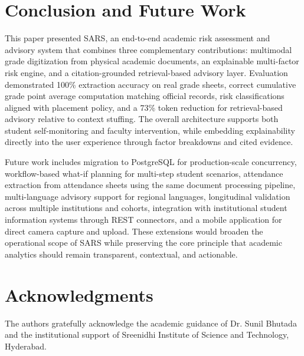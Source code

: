 \documentclass{article}
\begin{document}
\section{Conclusion and Future Work}
This paper presented SARS, an end-to-end academic risk assessment and advisory system that combines three complementary contributions: multimodal grade digitization from physical academic documents, an explainable multi-factor risk engine, and a citation-grounded retrieval-based advisory layer. Evaluation demonstrated 100\% extraction accuracy on real grade sheets, correct cumulative grade point average computation matching official records, risk classifications aligned with placement policy, and a 73\% token reduction for retrieval-based advisory relative to context stuffing. The overall architecture supports both student self-monitoring and faculty intervention, while embedding explainability directly into the user experience through factor breakdowns and cited evidence.

Future work includes migration to PostgreSQL for production-scale concurrency, workflow-based what-if planning for multi-step student scenarios, attendance extraction from attendance sheets using the same document processing pipeline, multi-language advisory support for regional languages, longitudinal validation across multiple institutions and cohorts, integration with institutional student information systems through REST connectors, and a mobile application for direct camera capture and upload. These extensions would broaden the operational scope of SARS while preserving the core principle that academic analytics should remain transparent, contextual, and actionable.

\section*{Acknowledgments}
The authors gratefully acknowledge the academic guidance of Dr. Sunil Bhutada and the institutional support of Sreenidhi Institute of Science and Technology, Hyderabad.

\printbibliography
\end{document}
